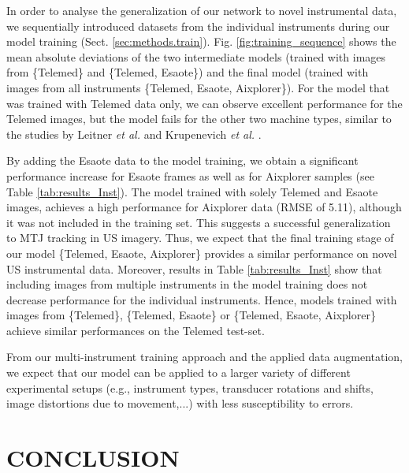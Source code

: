 \documentclass[journal,twoside,web]{ieeecolor}
\begin{document}
In order to analyse the generalization of our network to novel instrumental data, we sequentially introduced datasets from the individual instruments during our model training (Sect. \ref{sec:methods.train}). Fig. \ref{fig:training_sequence} shows the mean absolute deviations of the two intermediate models (trained with images from \{Telemed\} and \{Telemed, Esaote\}) and the final model (trained with images from all instruments \{Telemed, Esaote, Aixplorer\}). For the model that was trained with Telemed data only, we can observe excellent performance for the Telemed images, but the model fails for the other two machine types, similar to the studies by Leitner \textit{et al.} \cite{c:LeitnerJarolim2020} and Krupenevich \textit{et al.} \cite{j:Krupenevich2021}.

By adding the Esaote data to the model training, we obtain a significant performance increase for Esaote frames as well as for Aixplorer samples (see Table \ref{tab:results_Inst}). The model trained with solely Telemed and Esaote images, achieves a high performance for Aixplorer data (RMSE of 5.11), although it was not included in the training set. This suggests a successful generalization to MTJ tracking in US imagery. Thus, we expect that the final training stage of our model \{Telemed, Esaote, Aixplorer\} provides a similar performance on novel US instrumental data. Moreover, results in Table \ref{tab:results_Inst} show that including images from multiple instruments in the model training does not decrease performance for the individual instruments. Hence, models trained with images from \{Telemed\}, \{Telemed, Esaote\} or \{Telemed, Esaote, Aixplorer\} achieve similar performances on the Telemed test-set.

From our multi-instrument training approach and the applied data augmentation, we expect that our model can be applied to a larger variety of different experimental setups (e.g., instrument types, transducer rotations and shifts, image distortions due to movement,...) with less susceptibility to errors.
 \section{CONCLUSION}
\label{sec:conclusion}
\end{document}
